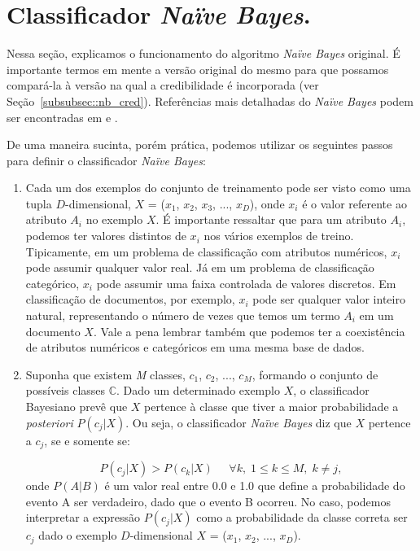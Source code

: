 
\section{Classificador \textit{Naïve Bayes}.}
\label{subsec::cred_nb}

Nessa seção, explicamos o funcionamento do algoritmo \textit{Naïve Bayes} original. É importante termos em mente a versão original do mesmo para que possamos compará-la à versão na qual a credibilidade é incorporada (ver Seção~\ref{subsubsec::nb_cred}). Referências mais detalhadas do \textit{Naïve Bayes} podem ser encontradas em \cite{DHS01} e \cite{Manning08}.

De uma maneira sucinta, porém prática, podemos utilizar os seguintes passos para definir o classificador \textit{Naïve Bayes}:

\begin{enumerate}
    \item Cada um dos exemplos do conjunto de treinamento pode ser visto como uma tupla $D$-dimensional, $X$ = ($x_1$, $x_2$, $x_3$, ..., $x_D$), onde $x_i$ é o valor referente ao atributo $A_i$ no exemplo $X$. É importante ressaltar que para um atributo $A_i$, podemos ter valores distintos de $x_i$ nos vários exemplos de treino. Tipicamente, em um problema de classificação com atributos numéricos, $x_i$ pode assumir qualquer valor real. Já em um problema de classificação categórico, $x_i$ pode assumir uma faixa controlada de valores discretos. Em classificação de documentos, por exemplo, $x_i$ pode ser qualquer valor inteiro natural, representando o número de vezes que temos um termo $A_i$ em um documento $X$. Vale a pena lembrar também que podemos ter a coexistência de atributos numéricos e categóricos em uma mesma base de dados.
    

    \item Suponha que existem \textit{M} classes, $c_1$, $c_2$, ..., $c_\textit{M}$, formando o conjunto de possíveis classes $\mathbb{C}$. Dado um determinado exemplo $X$, o classificador Bayesiano prevê que $X$ pertence à classe que tiver a maior probabilidade a \textit{posteriori} $P(c_j|X)$. Ou seja, o classificador \textit{Naïve Bayes} diz que $X$ pertence a $c_j$, se e somente se:
        
\begin{equation}\label{eqn::max_pcgivenx}
   P(c_{j}|X) > P(c_{k}|X) \;\;\;\;\;\forall k,\; 1 \le k \le M, \; k \not= j,
\end{equation}
onde $P(A|B)$ é um valor real entre 0.0 e 1.0 que define a probabilidade do evento A ser verdadeiro, dado que o evento B ocorreu. No caso, podemos interpretar a expressão $P(c_j|X)$ como a probabilidade da classe correta ser $c_j$ dado o exemplo $D$-dimensional $X$ = ($x_1$, $x_2$, ..., $x_D$).


\end{enumerate}
